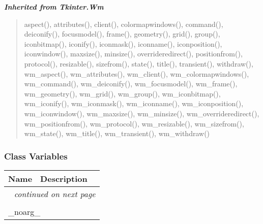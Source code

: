 \large{\textbf{\textit{Inherited from Tkinter.Wm}}}

\begin{quote}
aspect(), attributes(), client(), colormapwindows(), command(), deiconify(), focusmodel(), frame(), geometry(), grid(), group(), iconbitmap(), iconify(), iconmask(), iconname(), iconposition(), iconwindow(), maxsize(), minsize(), overrideredirect(), positionfrom(), protocol(), resizable(), sizefrom(), state(), title(), transient(), withdraw(), wm\_aspect(), wm\_attributes(), wm\_client(), wm\_colormapwindows(), wm\_command(), wm\_deiconify(), wm\_focusmodel(), wm\_frame(), wm\_geometry(), wm\_grid(), wm\_group(), wm\_iconbitmap(), wm\_iconify(), wm\_iconmask(), wm\_iconname(), wm\_iconposition(), wm\_iconwindow(), wm\_maxsize(), wm\_minsize(), wm\_overrideredirect(), wm\_positionfrom(), wm\_protocol(), wm\_resizable(), wm\_sizefrom(), wm\_state(), wm\_title(), wm\_transient(), wm\_withdraw()
\end{quote}


  \subsubsection{Class Variables}

    \vspace{-1cm}
\hspace{\varindent}\begin{longtable}{|p{\varnamewidth}|p{\vardescrwidth}|l}
\cline{1-2}
\cline{1-2} \centering \textbf{Name} & \centering \textbf{Description}& \\
\cline{1-2}
\endhead\cline{1-2}\multicolumn{3}{r}{\small\textit{continued on next page}}\\\endfoot\cline{1-2}
\endlastfoot\multicolumn{2}{|l|}{\textit{Inherited from Tkinter.Misc}}\\
\multicolumn{2}{|p{\varwidth}|}{\raggedright \_noarg\_}\\
\cline{1-2}
\end{longtable}

